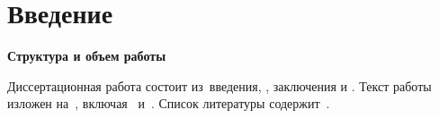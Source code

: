 
\chapter*{Введение}                         

\newcommand{\actuality}{\textbf{\actualityTXT}}
\newcommand{\progress}{\textbf{\progressTXT}}
\newcommand{\aim}{{\textbf\aimTXT}}
\newcommand{\tasks}{\textbf{\tasksTXT}}
\newcommand{\novelty}{\textbf{\noveltyTXT}}
\newcommand{\influence}{\textbf{\influenceTXT}}
\newcommand{\methods}{\textbf{\methodsTXT}}
\newcommand{\defpositions}{\textbf{\defpositionsTXT}}
\newcommand{\reliability}{\textbf{\reliabilityTXT}}
\newcommand{\probation}{\textbf{\probationTXT}}
\newcommand{\contribution}{\textbf{\contributionTXT}}
\newcommand{\pasport}{\textbf{\pasportTXT}}
\newcommand{\publications}{\textbf{\publicationsTXT}}

 

\textbf{Структура и объем работы} 

Диссертационная работа состоит из~введения, , заключения и . Текст работы изложен на~, включая~ и~. Список литературы содержит~.